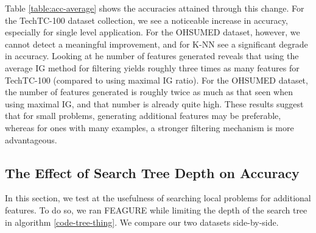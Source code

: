 \documentclass[twoside,11pt]{article}
\theoremstyle{definition}
\begin{document}
Table \ref{table:acc-average} shows the accuracies attained through this change. For the TechTC-100 dataset collection, we see a noticeable increase in accuracy, especially for single level application. For the OHSUMED dataset, however, we cannot detect a meaningful improvement, and for K-NN see a significant degrade in accuracy. 
Looking at he number of features generated reveals that using the average IG method for filtering yields roughly three times as many features for TechTC-100 (compared to using maximal IG ratio). For the OHSUMED dataset, the number of features generated is roughly twice as much as that seen when using maximal IG, and that number is already quite high. 
These results suggest that for small problems, generating additional features may be preferable, whereas for ones with many examples, a stronger filtering mechanism is more advantageous. 


\subsection{The Effect of Search Tree Depth on Accuracy}

In this section, we test at the usefulness of searching local problems for additional features.
To do so, we ran FEAGURE while limiting the depth of the search tree in algorithm \ref{code-tree-thing}. 
We compare our two datasets side-by-side.
\end{document}
